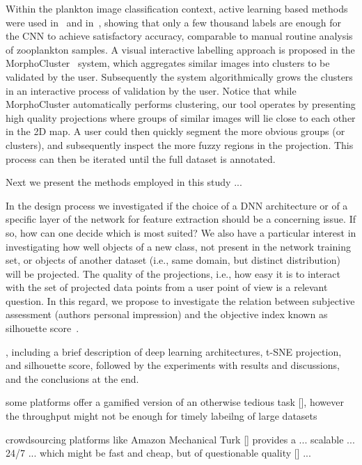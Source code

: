 \documentclass[sn-basic]{sn-jnl}%
\theoremstyle{thmstyleone}%
\theoremstyle{thmstyletwo}%
\theoremstyle{thmstylethree}%
\begin{document}
Within the plankton image classification context, active learning based methods were used in~\citep{luo-paper-al} and in~\citep{bochinski-paper}, showing that only a few thousand labels are enough for the CNN to achieve satisfactory accuracy, comparable to manual routine analysis of zooplankton samples. A visual interactive labelling approach is proposed in the MorphoCluster~\citep{morphocluster-paper} system, which aggregates similar images into clusters to be validated by the user. Subsequently the system algorithmically grows the clusters in an interactive process of validation by the user. Notice that while MorphoCluster automatically performs clustering, our tool operates by presenting high quality projections where groups of similar images will lie close to each other in the 2D map. A user could then quickly segment the more obvious groups (or clusters), and subsequently inspect the more fuzzy regions in the projection. This process can then be iterated until the full dataset is annotated.

Next we present the methods employed in this study ...

In the design process we investigated if the choice of a DNN architecture or of a specific layer of the network for feature extraction should be a concerning issue. If so, how can one decide which is most suited? We also have a particular interest in investigating how well objects of a new class, not present in the network training set, or objects of another dataset (i.e., same domain, but distinct distribution) will be projected. The quality of the projections, i.e., how easy it is to interact with the set of projected data points from a user point of view is a relevant question. In this regard, we propose to investigate the relation between subjective assessment (authors personal impression) and the objective index known as silhouette score~\citep{rousseeuw-silhouette}.

, including a brief description of deep learning architectures, t-SNE projection, and silhouette score, followed by the experiments with results and discussions, and the conclusions at the end.


some platforms offer a gamified version of an otherwise tedious task [], however the throughput might not be enough for timely labeilng of large datasets

crowdsourcing platforms like Amazon Mechanical Turk [] provides a ... scalable ... 24/7 ... which might be fast and cheap, but of questionable quality [] ...
\end{document}
